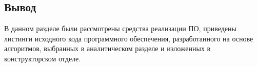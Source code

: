\subsection*{Вывод}
В данном разделе были рассмотрены средства реализации ПО, приведены 
листинги исходного кода программного обеспечения, разработанного на основе 
алгоритмов,  выбранных  в  аналитическом  разделе  и  изложенных  в 
конструкторском отделе.

\pagebreak